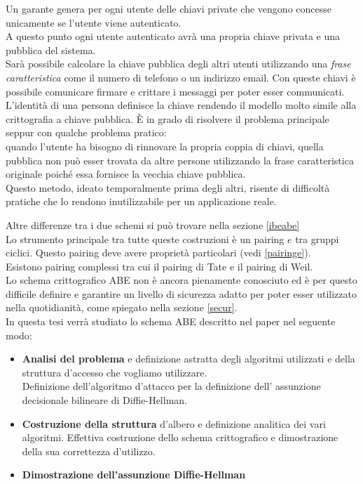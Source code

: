  Un garante genera per ogni utente delle chiavi private che vengono concesse unicamente se l'utente viene autenticato.\\
 A questo punto ogni utente autenticato avrà una propria chiave privata e una pubblica del sistema.\\
 Sarà possibile calcolare la chiave pubblica degli altri utenti utilizzando una \emph{frase caratteristica} come il numero di telefono o un indirizzo email. Con queste chiavi è possibile comunicare firmare e crittare i messaggi per poter esser communicati.\\[0.2cm]
 L'identità di una persona definisce la chiave rendendo il modello molto simile alla crittografia a chiave pubblica. È in grado di risolvere il problema principale seppur con qualche problema pratico:\\
quando l'utente ha bisogno di rinnovare la propria coppia di chiavi, quella pubblica non può esser trovata da altre persone utilizzando la frase caratteristica originale poiché essa fornisce la vecchia chiave pubblica.\\[0.2cm]

Questo metodo, ideato temporalmente prima degli altri, risente di difficoltà pratiche che lo rendono inutilizzabile per un applicazione reale.

\vspace{0.2cm}

Altre differenze tra i due schemi si può trovare nella sezione \ref{ibeabe}\\[0.2cm]


Lo strumento principale tra tutte queste costruzioni è un pairing $e$ tra gruppi ciclici. Questo pairing deve avere proprietà particolari (vedi \ref{pairinge}).\\
Esistono pairing complessi \cite{maas} \cite{benoit} tra cui il pairing di Tate e il pairing di Weil.\\[0.2cm]

Lo schema crittografico ABE non è ancora pienamente conosciuto ed è per questo difficile definire e garantire un livello di sicurezza adatto per poter esser utilizzato nella quotidianità, come spiegato nella sezione \ref{secur}.\\[0.2cm]

In questa tesi verrà studiato lo schema ABE descritto nel paper \cite{kpabe} nel seguente modo:
\begin{itemize}
	\item \textbf{Analisi del problema} e definizione astratta degli algoritmi utilizzati e della struttura d'accesso che vogliamo utilizzare.\\
	Definizione dell'algoritmo d'attacco per la definizione dell' assunzione decisionale bilineare di Diffie-Hellman.
	\item \textbf{Costruzione della struttura} d'albero e definizione analitica dei vari algoritmi. Effettiva costruzione dello schema crittografico e dimostrazione della sua correttezza d'utilizzo.
	\item \textbf{Dimostrazione dell'assunzione Diffie-Hellman}
\end{itemize}
\vspace{0.4cm}

